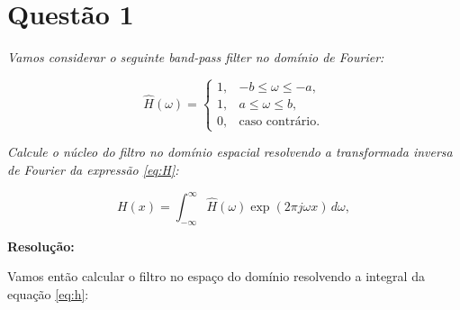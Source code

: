 \documentclass[]{abntex2}
\begin{document}
\frenchspacing 

\maketitle

\section*{\textbf{Questão 1}}

\textit{Vamos considerar o seguinte band-pass filter no domínio de Fourier:}

\begin{equation}
\widehat{H}(\omega) =
\begin{cases}
    1, & -b \leq \omega \leq -a, \\
    1, & a \leq \omega \leq b, \\
    0, & \text{caso contrário.}
\end{cases}
\label{eq:H}
\end{equation}

\textit{Calcule o núcleo do filtro no domínio espacial resolvendo a transformada inversa de Fourier da expressão \ref{eq:H}:}

\begin{equation}
H(x) = \int_{-\infty}^{\infty} \widehat{H}(\omega) \exp(2 \pi j \omega x) \, d\omega,
\label{eq:h}
\end{equation}

\textbf{Resolução:}

Vamos então calcular o filtro no espaço do domínio resolvendo a integral da equação \ref{eq:h}:
\end{document}
